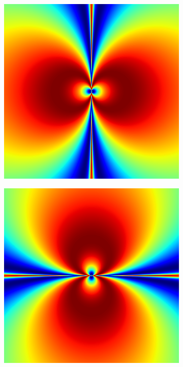 \begin{figure}
\begin{subfigure}{.32\textwidth}
\includegraphics[width=\textwidth]{inv_real.png}
\end{subfigure}
\begin{subfigure}{.32\textwidth}
\includegraphics[width=\textwidth]{inv_imag.png}

\end{subfigure}
\end{figure}
